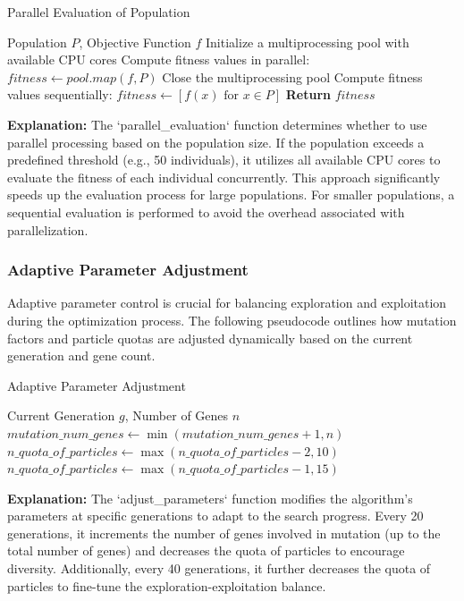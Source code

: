 \documentclass[conference]{IEEEtran}
\begin{document}
\begin{algorithm}[H]
\caption{Parallel Evaluation of Population}
\label{alg:parallel_evaluation}
\begin{algorithmic}[1]
\REQUIRE Population $P$, Objective Function $f$
    \STATE Initialize a multiprocessing pool with available CPU cores
    \STATE Compute fitness values in parallel: $fitness \gets pool.map(f, P)$
    \STATE Close the multiprocessing pool
\ELSE
    \STATE Compute fitness values sequentially: $fitness \gets [f(x) \text{ for } x \in P]$
\ENDIF
\STATE \textbf{Return} $fitness$
\end{algorithmic}
\end{algorithm}

\textbf{Explanation:}  
The `parallel\_evaluation` function determines whether to use parallel processing based on the population size. If the population exceeds a predefined threshold (e.g., 50 individuals), it utilizes all available CPU cores to evaluate the fitness of each individual concurrently. This approach significantly speeds up the evaluation process for large populations. For smaller populations, a sequential evaluation is performed to avoid the overhead associated with parallelization.

\subsubsection{Adaptive Parameter Adjustment}

Adaptive parameter control is crucial for balancing exploration and exploitation during the optimization process. The following pseudocode outlines how mutation factors and particle quotas are adjusted dynamically based on the current generation and gene count.

\begin{algorithm}[H]
\caption{Adaptive Parameter Adjustment}
\label{alg:adjust_parameters}
\begin{algorithmic}[1]
\REQUIRE Current Generation $g$, Number of Genes $n$
    \STATE $mutation\_num\_genes \gets \min(mutation\_num\_genes + 1, n)$
    \STATE $n\_quota\_of\_particles \gets \max(n\_quota\_of\_particles - 2, 10)$
    \STATE $n\_quota\_of\_particles \gets \max(n\_quota\_of\_particles - 1, 15)$
\ENDIF
\end{algorithmic}
\end{algorithm}

\textbf{Explanation:}  
The `adjust\_parameters` function modifies the algorithm's parameters at specific generations to adapt to the search progress. Every 20 generations, it increments the number of genes involved in mutation (up to the total number of genes) and decreases the quota of particles to encourage diversity. Additionally, every 40 generations, it further decreases the quota of particles to fine-tune the exploration-exploitation balance.
\end{document}
